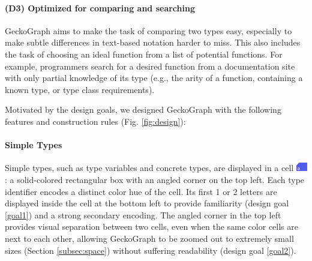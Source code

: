 \documentclass[preprint,12pt]{elsarticle}
\begin{document}
\paragraph{\textbf{(D3) Optimized for comparing and searching}} \label{goal3} GeckoGraph aims to make the task of comparing two types easy, especially to make subtle differences in text-based notation harder to miss. This also includes the task of choosing an ideal function from a list of potential functions. For example, programmers search for a desired function from a documentation site with only partial knowledge of its type (e.g., the arity of a function, containing a known type, or type class requirements). 

Motivated by the design goals, we designed GeckoGraph with the following features and construction rules (Fig. \ref{fig:design}):

\paragraph{Simple Types} 
Simple types, such as type variables and concrete types, are displayed in a cell \includegraphics[height=1em]{figures/SimpleType}: a solid-colored rectangular box with an angled corner on the top left. Each type identifier encodes a distinct color hue of the cell. Its first 1 or 2 letters are displayed inside the cell at the bottom left to provide familiarity (design goal \ref{goal1}) and a strong secondary encoding. The angled corner in the top left provides visual separation between two cells, even when the same color cells are next to each other, allowing GeckoGraph to be zoomed out to extremely small sizes (Section \ref{subsec:space}) without suffering readability (design goal \ref{goal2}).
\end{document}
